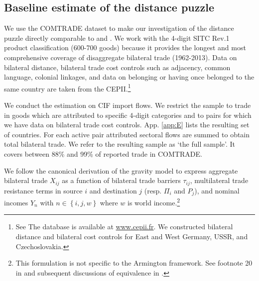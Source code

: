 \documentclass[12pt,twoside,a4paper,notitlepage]{article}
\begin{document}
\subsection{Baseline estimate of the distance puzzle} \label{subsec:baselineDP}
We use the COMTRADE dataset to make our investigation of the distance puzzle directly comparable to \cite{Head2013} and \cite{Berthelon2008}.
We work with the 4-digit SITC Rev.1 product classification (600-700 goods) because it provides the longest and most comprehensive coverage of disaggregate bilateral trade (1962-2013).
Data on bilateral distance, bilateral trade cost controls such as adjacency, common language, colonial linkages, and data on belonging or having once belonged to the same country are taken from the CEPII.\footnote{See \cite{Mayer2011}
	The database is available at \url{www.cepii.fr}.
	We constructed bilateral distance and bilateral cost controls for East and West Germany, USSR, and Czechoslovakia.}


We conduct the estimation on CIF import flows.
We restrict the sample to trade in goods which are attributed to specific 4-digit categories and to pairs for which we have data on bilateral trade cost controls.
App.
\ref{app:E} lists the resulting set of countries.
For each active pair attributed sectoral flows are summed to obtain total bilateral trade.
We refer to the resulting sample as `the full sample'.
It covers between 88\% and 99\% of reported trade in COMTRADE.

We follow the canonical \cite{Anderson2003} derivation of the gravity model to express aggregate bilateral trade $X_{ij}$ as a function of bilateral trade barriers $\tau_{ij}$, multilateral trade resistance terms in source $i$ and destination $j$ (resp.
$\Pi_{i}$ and $P_{j}$), and nominal incomes $Y_{n}$ with $n\in\left\{i,j,w\right\}$ where $w$ is world income.\footnote{This formulation is not specific to the Armington framework.
See footnote 20 in \cite{Eaton2002} and subsequent discussions of equivalence in  \cite{Arkolakis2012, Head2013}.}
\end{document}
